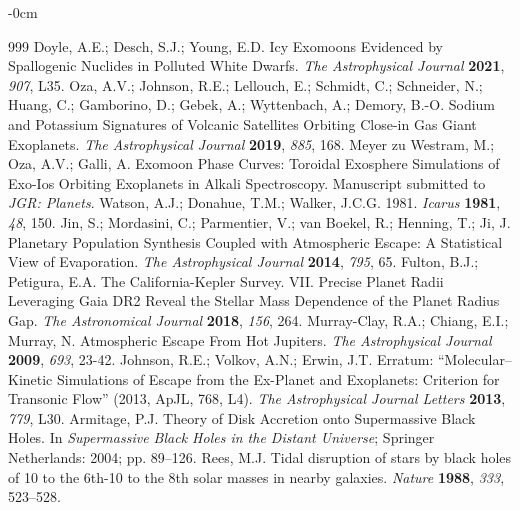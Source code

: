 \documentclass[journal,article,submit,pdftex,moreauthors]{Definitions/mdpi}
\begin{document}
\begin{adjustwidth}{-\extralength}{0cm}
\begin{thebibliography}{999}
Doyle, A.E.; Desch, S.J.; Young, E.D. Icy Exomoons Evidenced by Spallogenic Nuclides in Polluted White Dwarfs. {\em The Astrophysical Journal} {\bf 2021}, {\em 907}, L35.
Oza, A.V.; Johnson, R.E.; Lellouch, E.; Schmidt, C.; Schneider, N.; Huang, C.; Gamborino, D.; Gebek, A.; Wyttenbach, A.; Demory, B.-O. Sodium and Potassium Signatures of Volcanic Satellites Orbiting Close-in Gas Giant Exoplanets. {\em The Astrophysical Journal} {\bf 2019}, {\em 885}, 168.
Meyer zu Westram, M.; Oza, A.V.; Galli, A. Exomoon Phase Curves: Toroidal Exosphere Simulations of Exo-Ios Orbiting Exoplanets in Alkali Spectroscopy. Manuscript submitted to {\em JGR: Planets}.
Watson, A.J.; Donahue, T.M.; Walker, J.C.G. 1981. {\em Icarus} {\bf 1981}, {\em 48}, 150.
Jin, S.; Mordasini, C.; Parmentier, V.; van Boekel, R.; Henning, T.; Ji, J. Planetary Population Synthesis Coupled with Atmospheric Escape: A Statistical View of Evaporation. {\em The Astrophysical Journal} {\bf 2014}, {\em 795}, 65.
Fulton, B.J.; Petigura, E.A. The California-Kepler Survey. VII. Precise Planet Radii Leveraging Gaia DR2 Reveal the Stellar Mass Dependence of the Planet Radius Gap. {\em The Astronomical Journal} {\bf 2018}, {\em 156}, 264.
Murray-Clay, R.A.; Chiang, E.I.; Murray, N. Atmospheric Escape From Hot Jupiters. {\em The Astrophysical Journal} {\bf 2009}, {\em 693}, 23-42.
Johnson, R.E.; Volkov, A.N.; Erwin, J.T. Erratum: “Molecular–Kinetic Simulations of Escape from the Ex-Planet and Exoplanets: Criterion for Transonic Flow” (2013, ApJL, 768, L4). {\em The Astrophysical Journal Letters} {\bf 2013}, {\em 779}, L30.
Armitage, P.J. Theory of Disk Accretion onto Supermassive Black Holes. In {\em Supermassive Black Holes in the Distant Universe}; Springer Netherlands: 2004; pp. 89--126.
Rees, M.J. Tidal disruption of stars by black holes of 10 to the 6th-10 to the 8th solar masses in nearby galaxies. {\em Nature} {\bf 1988}, {\em 333}, 523--528.

\end{thebibliography}
\end{adjustwidth}
\end{document}
